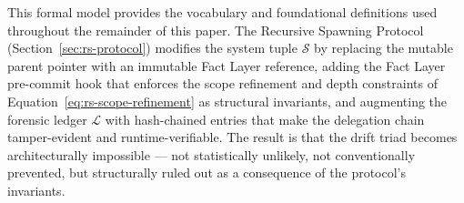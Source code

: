 This formal model provides the vocabulary and foundational definitions used throughout the remainder of this paper. The Recursive Spawning Protocol (Section~\ref{sec:rs-protocol}) modifies the system tuple $\mathcal{S}$ by replacing the mutable parent pointer with an immutable Fact Layer reference, adding the Fact Layer pre-commit hook that enforces the scope refinement and depth constraints of Equation~\ref{eq:rs-scope-refinement} as structural invariants, and augmenting the forensic ledger $\mathcal{L}$ with hash-chained entries that make the delegation chain tamper-evident and runtime-verifiable. The result is that the drift triad becomes architecturally impossible — not statistically unlikely, not conventionally prevented, but structurally ruled out as a consequence of the protocol's invariants.